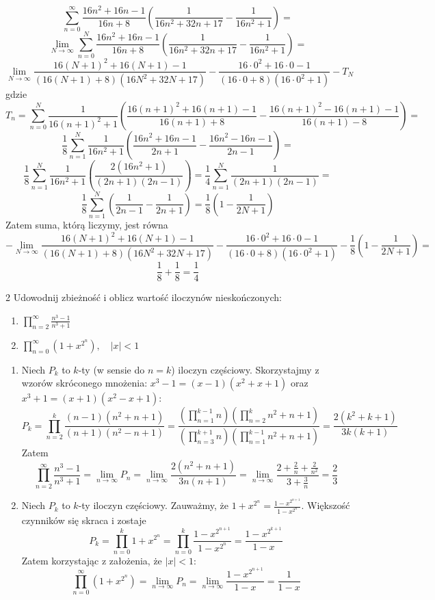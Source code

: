 \documentclass{../note}
\begin{document}
\begin{rozwiazanie}
\begin{enumerate}[label=(\alph*)]
    \[\sum_{n=0}^{\infty} \frac{16n^2+16n-1}{16n+8}\left(\frac{1}{16n^2+32n+17} - \frac{1}{16n^2+1}\right) =\]
    \[ \lim_{N\to\infty} \sum_{n=0}^{N} \frac{16n^2+16n-1}{16n+8}\left(\frac{1}{16n^2+32n+17} - \frac{1}{16n^2+1}\right) =\]
    \[ \lim_{N\to\infty} \frac{16(N+1)^2+16(N+1)-1}{(16(N+1)+8)(16N^2+32N+17)} - \frac{16\cdot0^2+16\cdot0-1}{(16\cdot0+8)(16\cdot0^2+1)} - T_N\]
    gdzie
    \[T_n = \sum_{n=0}^{N} \frac{1}{16(n+1)^2+1} \left(\frac{16(n+1)^2+16(n+1)-1}{16(n+1)+8} - \frac{16(n+1)^2-16(n+1)-1}{16(n+1)-8}\right)=\]
    \[\frac18\sum_{n=1}^{N} \frac{1}{16n^2+1} \left(\frac{16n^2+16n-1}{2n+1} - \frac{16n^2-16n-1}{2n-1}\right) =\]
    \[\frac18\sum_{n=1}^{N} \frac{1}{16n^2+1} \left(\frac{2(16n^2+1)}{(2n+1)(2n-1)}\right) = \frac14\sum_{n=1}^{N} \frac{1}{(2n+1)(2n-1)} =\]
    \[\frac18\sum_{n=1}^{N}\left(\frac{1}{2n-1} - \frac{1}{2n+1}\right) = \frac18\left(1-\frac{1}{2N+1}\right)\]
    Zatem suma, którą liczymy, jest równa
    \[-\lim_{N\to\infty} \frac{16(N+1)^2+16(N+1)-1}{(16(N+1)+8)(16N^2+32N+17)} - \frac{16\cdot0^2+16\cdot0-1}{(16\cdot0+8)(16\cdot0^2+1)} - \frac18\left(1-\frac{1}{2N+1}\right) =\]
    \[\frac18 + \frac18 = \frac14\]
\end{enumerate}
\end{rozwiazanie}

\begin{zadanie}{2}
Udowodnij zbieżność i oblicz wartość iloczynów nieskończonych:
\begin{enumerate}[label=(\alph*)]
    \item $\prod_{n=2}^{\infty}\frac{n^{3}-1}{n^{3}+1}$
    \item $\prod_{n=0}^{\infty}(1+x^{2^{n}}), \quad |x|<1$
\end{enumerate}
\end{zadanie}
\begin{rozwiazanie}
\begin{enumerate}[label=(\alph*)]
    \item Niech $P_k$ to $k$-ty (w sensie do $n=k$) iloczyn częściowy. Skorzystajmy z wzorów skróconego mnożenia: $x^3-1 = (x-1)(x^2+x+1)$ oraz $x^3+1 = (x+1)(x^2-x+1)$:
    \[P_k = \prod_{n=2}^{k}\frac{(n-1)(n^2+n+1)}{(n+1)(n^2-n+1)} = \frac{\left(\prod_{n=1}^{k-1} n\right) \left(\prod_{n=2}^{k} n^2+n+1\right)}{\left(\prod_{n=3}^{k+1} n\right) \left(\prod_{n=1}^{k-1} n^2+n+1\right)} = \frac{2(k^2+k+1)}{3k(k+1)}\]
    Zatem
    \[\prod_{n=2}^{\infty}\frac{n^{3}-1}{n^{3}+1} = \lim_{n\to\infty} P_n = \lim_{n\to\infty} \frac{2(n^2+n+1)}{3n(n+1)} = \lim_{n\to\infty} \frac{2+\frac2n+\frac{2}{n^2}}{3+\frac3n} = \frac23\]
    \item Niech $P_k$ to $k$-ty iloczyn częściowy. Zauważmy, że $1+x^{2^{n}} = \frac{1-x^{2^{n+1}}}{1-x^{2^{n}}}$. Większość czynników się skraca i zostaje
    \[P_k = \prod_{n=0}^{k}1+x^{2^{n}} = \prod_{n=0}^{k} \frac{1-x^{2^{n+1}}}{1-x^{2^{n}}} = \frac{1-x^{2^{k+1}}}{1-x}\]
    Zatem korzystając z założenia, że $|x|<1$:
    \[\prod_{n=0}^{\infty}(1+x^{2^{n}}) = \lim_{n\to\infty} P_n = \lim_{n\to\infty} \frac{1-x^{2^{n+1}}}{1-x} = \frac{1}{1-x}\]
\end{enumerate}
\end{rozwiazanie}
\end{document}
